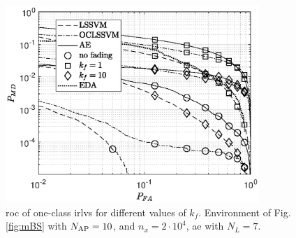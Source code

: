 \documentclass[final,twocolumn]{IEEEtran}
\begin{document}
\begin{figure}[t]
    \centering
    \includegraphics[width=9.6cm]{res_Fading_new_10BS_oneClass.eps}
    \caption{\ac{roc} of one-class \acp{irlv} for different values of $k_f$. Environment of Fig. \ref{fig:mBS} with $N_{\rm AP}=10$, and $n_x= 2 \cdot 10^4$,  \ac{ae} with $N_L = 7$.  }
    \label{fig:kf10Oc}
\end{figure}





\end{document}

